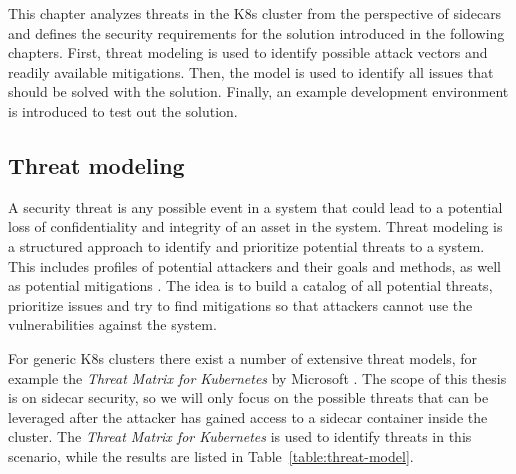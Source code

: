 \documentclass[english, 12pt, a4paper, sci, utf8, a-2b, online]{aaltothesis}
\begin{document}
This chapter analyzes threats in the K8s cluster from the perspective of sidecars and defines the security requirements for the solution introduced in the following chapters. First, threat modeling is used to identify possible attack vectors and readily available mitigations. Then, the model is used to identify all issues that should be solved with the solution. Finally, an example development environment is introduced to test out the solution.

\subsection{Threat modeling}




A security threat is any possible event in a system that could lead to a potential loss of confidentiality and integrity of an asset in the system. Threat modeling is a structured approach to identify and prioritize potential threats to a system. This includes profiles of potential attackers and their goals and methods, as well as potential mitigations \cite{shevchenko2018threat}. The idea is to build a catalog of all potential threats, prioritize issues and try to find mitigations so that attackers cannot use the vulnerabilities against the system.


For generic K8s clusters there exist a number of extensive threat models, for example the \textit{Threat Matrix for Kubernetes} by Microsoft \cite{k8s-threat-matrix}. The scope of this thesis is on sidecar security, so we will only focus on the possible threats that can be leveraged after the attacker has gained access to a sidecar container inside the cluster. The \textit{Threat Matrix for Kubernetes} is used to identify threats in this scenario, while the results are listed in Table~\ref{table:threat-model}.
\end{document}
